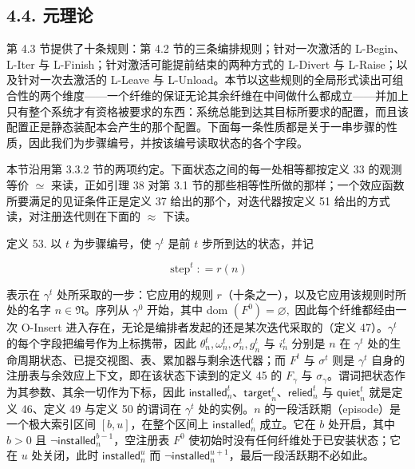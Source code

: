 \subsection{4.4. 元理论}\label{metatheory}

第 4.3 节提供了十条规则：第 4.2 节的三条编排规则；针对一次激活的 L-Begin、L-Iter 与 L-Finish；针对激活可能提前结束的两种方式的 L-Divert 与 L-Raise；以及针对一次去激活的 L-Leave 与 L-Unload。本节以这些规则的全局形式读出可组合性的两个维度——一个纤维的保证无论其余纤维在中间做什么都成立——并加上只有整个系统才有资格被要求的东西：系统总能到达其目标所要求的配置，而且该配置正是静态装配本会产生的那个配置。下面每一条性质都是关于一串步骤的性质，因此我们为步骤编号，并按该编号读取状态的各个字段。

本节沿用第 3.3.2 节的两项约定。下面状态之间的每一处相等都按定义 33 的观测等价 $\simeq$ 来读，正如引理 38 对第 3.1 节的那些相等性所做的那样；一个效应函数所要满足的见证条件正是定义 37 给出的那个，对迭代器按定义 51 给出的方式读，对注册迭代则在下面的 $\approx$ 下读。

定义 53. 以 $t$ 为步骤编号，使 $\gamma ^ { t }$ 是前 $t$ 步所到达的状态，并记

\[
\operatorname { s t e p } ^ { t } : = r ( n )\tag{50}
\]

表示在 $\gamma ^ { t }$ 处所采取的一步：它应用的规则 $r$（十条之一），以及它应用该规则时所处的名字 $n \in \mathfrak { N }$。序列从 $\gamma ^ { 0 }$ 开始，其中 dom $\left( F ^ { 0 } \right) = \varnothing ,$ 因此每个纤维都经由一次 O-Insert 进入存在，无论是编排者发起的还是某次迭代采取的（定义 47）。$\gamma ^ { t }$ 的每个字段把编号作为上标携带，因此 $\theta _ { n } ^ { t } , \omega _ { n } ^ { t } , \sigma _ { n } ^ { t } , g _ { n } ^ { t }$ 与 $i _ { n } ^ { t }$ 分别是 $n$ 在 $\gamma ^ { t }$ 处的生命周期状态、已提交视图、表、累加器与剩余迭代器；而 $F ^ { t }$ 与 $\sigma ^ { t }$ 则是 $\gamma ^ { t }$ 自身的注册表与余效应上下文，即在该状态下读到的定义 45 的 $F _ { \gamma }$ 与 $\sigma _ { \gamma }$。谓词把状态作为其参数、其余一切作为下标，因此 $\mathsf{installed}_{n}^{t}$、$\mathsf{target}_{n}^{t}$、$\mathsf{relied}_{n}^{t}$ 与 $\mathsf{quiet}_{n}^{t}$ 就是定义 46、定义 49 与定义 50 的谓词在 $\gamma ^ { t }$ 处的实例。$n$ 的一段活跃期（episode）是一个极大索引区间 $[ b , u ]$，在整个区间上 $\mathsf{installed}_{n}^{t}$ 成立。它在 $b$ 处开启，其中 $b > 0$ 且 $\neg \mathsf{installed}_{n}^{b - 1}$，空注册表 $F ^ { 0 }$ 使初始时没有任何纤维处于已安装状态；它在 $u$ 处关闭，此时 $\mathsf{installed}_{n}^{u}$ 而 $\neg \mathsf{installed}_{n}^{u + 1}$，最后一段活跃期不必如此。

